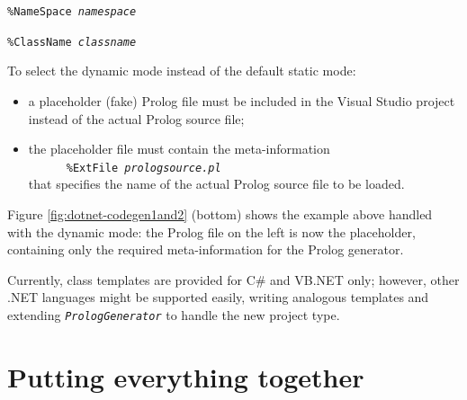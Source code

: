 \texttt{\%NameSpace \textit{namespace}}

\texttt{\%ClassName \textit{classname}}

\medskip

\noindent To select the dynamic mode instead of the default static mode:
\begin{itemize}
  \item a placeholder (fake) Prolog file must be included in the Visual Studio project
        instead of the actual Prolog source file;
  \item the placeholder file must contain the meta-information\\
        \mbox{~~~~~~}\texttt{\%ExtFile \textit{prologsource.pl}}\\
        that specifies the name of the actual Prolog source file to be loaded.
\end{itemize}

\noindent Figure \ref{fig:dotnet-codegen1and2} (bottom) shows the example above handled with the dynamic mode: the Prolog file on the left is now the placeholder, containing only the required meta-information for the Prolog generator.

Currently, class templates are provided for C\# and VB.NET only; however, other .NET languages might be supported easily, writing analogous templates and extending \texttt{\textit{PrologGenerator}} to handle the new project type.


%

\section{Putting everything together}
\label{sec:dotnet-putting-together}


